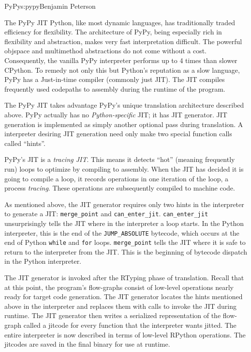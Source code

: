 \begin{aosachapter}{PyPy}{s:pypy}{Benjamin Peterson}
\begin{aosasect1}{The PyPy JIT}
Python, like most dynamic languages, has traditionally traded efficiency for
flexibility. The architecture of PyPy, being especially rich in flexibility and
abstraction, makes very fast interpretation difficult. The powerful objspace and
multimethod abstractions do not come without a cost. Consequently, the vanilla
PyPy interpreter performs up to 4 times than slower CPython. To remedy not only
this but Python's reputation as a slow language, PyPy has a Just-in-time
compiler (commonly just JIT). The JIT compiles frequently used codepaths to
assembly during the runtime of the program.

The PyPy JIT takes advantage PyPy's unique translation architecture described
above. PyPy actually has no \emph{Python-specific} JIT; it has JIT
generator. JIT generation is implemented as simply another optional pass during
translation. A interpreter desiring JIT generation need only make two special
function calls called ``hints''.

PyPy's JIT is a \emph{tracing JIT}. This means it detects ``hot'' (meaning
frequently run) loops to optimize by compiling to assembly. When the JIT has
decided it is going to compile a loop, it records operations in one iteration of
the loop, a process \emph{tracing}. These operations are subsequently compiled
to machine code.

As mentioned above, the JIT generator requires only two hints in the interpreter
to generate a JIT: \verb+merge_point+ and
\verb+can_enter_jit+. \verb+can_enter_jit+ unsurprisingly tells the JIT where in
the interpreter a loop starts. In the Python interpreter, this is the end of the
\verb+JUMP_ABSOLUTE+ bytecode, which occurs at the end of Python \verb+while+
and \verb+for+ loops. \verb+merge_point+ tells the JIT where it is safe to
return to the interpreter from the JIT. This is the beginning of bytecode
dispatch in the Python interpreter.

The JIT generator is invoked after the RTyping phase of translation. Recall that
at this point, the program's flow-graphs consist of low-level operations nearly
ready for target code generation. The JIT generator locates the hints mentioned
above in the interpreter and replaces them with calls to invoke the JIT during
runtime. The JIT generator then writes a serialized representation of the
flow-graph called a jitcode for every function that the interpreter wants
jitted. The entire interpreter is now described in terms of low-level RPython
operations. The jitcodes are saved in the final binary for use at runtime.


\end{aosasect1}
\end{aosachapter}
